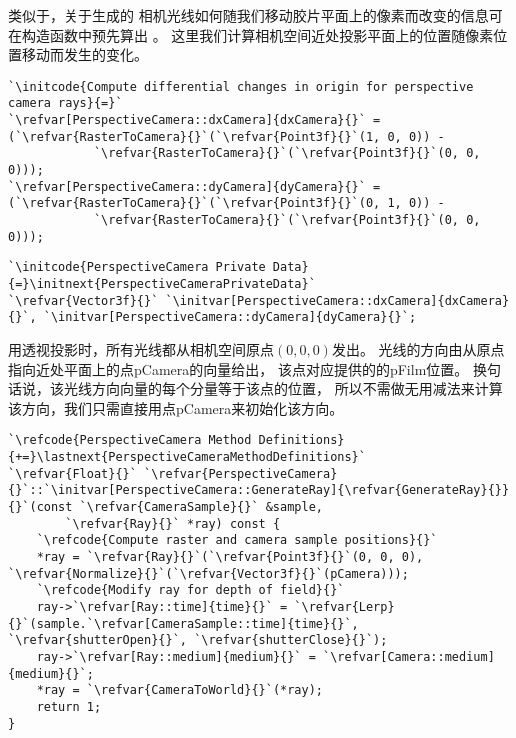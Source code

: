 类似于，关于生成的
相机光线如何随我们移动胶片平面上的像素而改变的信息可在构造函数中预先算出
。
这里我们计算相机空间近处投影平面上的位置随像素位置移动而发生的变化。
\begin{lstlisting}
`\initcode{Compute differential changes in origin for perspective camera rays}{=}`
`\refvar[PerspectiveCamera::dxCamera]{dxCamera}{}` = (`\refvar{RasterToCamera}{}`(`\refvar{Point3f}{}`(1, 0, 0)) -
            `\refvar{RasterToCamera}{}`(`\refvar{Point3f}{}`(0, 0, 0)));
`\refvar[PerspectiveCamera::dyCamera]{dyCamera}{}` = (`\refvar{RasterToCamera}{}`(`\refvar{Point3f}{}`(0, 1, 0)) -
            `\refvar{RasterToCamera}{}`(`\refvar{Point3f}{}`(0, 0, 0)));
\end{lstlisting}
\begin{lstlisting}
`\initcode{PerspectiveCamera Private Data}{=}\initnext{PerspectiveCameraPrivateData}`
`\refvar{Vector3f}{}` `\initvar[PerspectiveCamera::dxCamera]{dxCamera}{}`, `\initvar[PerspectiveCamera::dyCamera]{dyCamera}{}`;
\end{lstlisting}

用透视投影时，所有光线都从相机空间原点$(0,0,0)$发出。
光线的方向由从原点指向近处平面上的点{\ttfamily pCamera}的向量给出，
该点对应提供的的{\ttfamily pFilm}位置。
换句话说，该光线方向向量的每个分量等于该点的位置，
所以不需做无用减法来计算该方向，我们只需直接用点{\ttfamily pCamera}来初始化该方向。
\begin{lstlisting}
`\refcode{PerspectiveCamera Method Definitions}{+=}\lastnext{PerspectiveCameraMethodDefinitions}`
`\refvar{Float}{}` `\refvar{PerspectiveCamera}{}`::`\initvar[PerspectiveCamera::GenerateRay]{\refvar{GenerateRay}{}}{}`(const `\refvar{CameraSample}{}` &sample,
        `\refvar{Ray}{}` *ray) const {
    `\refcode{Compute raster and camera sample positions}{}`
    *ray = `\refvar{Ray}{}`(`\refvar{Point3f}{}`(0, 0, 0), `\refvar{Normalize}{}`(`\refvar{Vector3f}{}`(pCamera)));
    `\refcode{Modify ray for depth of field}{}`
    ray->`\refvar[Ray::time]{time}{}` = `\refvar{Lerp}{}`(sample.`\refvar[CameraSample::time]{time}{}`, `\refvar{shutterOpen}{}`, `\refvar{shutterClose}{}`);
    ray->`\refvar[Ray::medium]{medium}{}` = `\refvar[Camera::medium]{medium}{}`;
    *ray = `\refvar{CameraToWorld}{}`(*ray);
    return 1;
}
\end{lstlisting}

